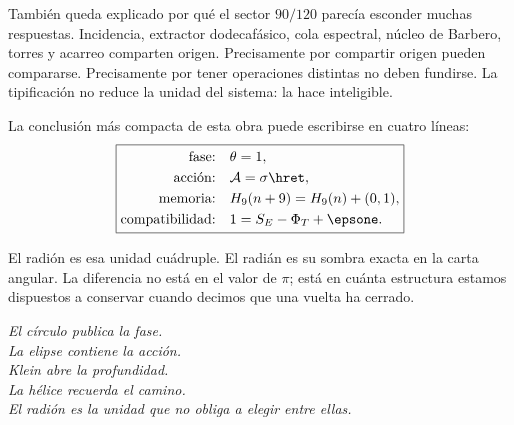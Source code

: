 También queda explicado por qué el sector \(90/120\) parecía esconder muchas
respuestas. Incidencia, extractor dodecafásico, cola espectral, núcleo de
Barbero, torres y acarreo comparten origen. Precisamente por compartir origen
pueden compararse. Precisamente por tener operaciones distintas no deben
fundirse. La tipificación no reduce la unidad del sistema: la hace inteligible.

La conclusión más compacta de esta obra puede escribirse en cuatro líneas:
\[
\boxed{
\begin{aligned}
\text{fase:}\quad&\theta=1,\\
\text{acción:}\quad&\mathcal A=\sigma\hret,\\
\text{memoria:}\quad&H_9(n+9)=H_9(n)+(0,1),\\
\text{compatibilidad:}\quad&1=S_E-\Phi_T+\epsone.
\end{aligned}}
\]

El radión es esa unidad cuádruple. El radián es su sombra exacta en la carta
angular. La diferencia no está en el valor de \(\pi\); está en cuánta
estructura estamos dispuestos a conservar cuando decimos que una vuelta ha
cerrado.

\vspace{2\baselineskip}
\begin{center}
\begin{minipage}{.82\textwidth}
\centering\large\itshape\color{RadNavy}
El círculo publica la fase.\\
La elipse contiene la acción.\\
Klein abre la profundidad.\\
La hélice recuerda el camino.\\[.7em]
El radión es la unidad que no obliga a elegir entre ellas.
\end{minipage}
\end{center}

